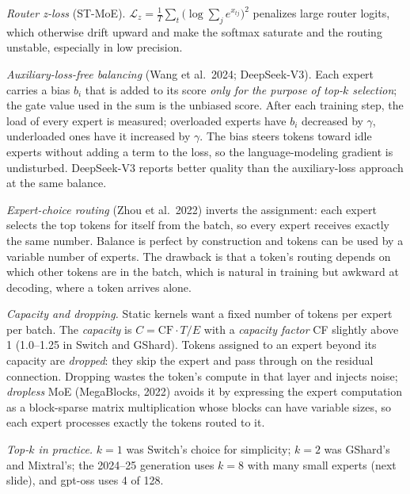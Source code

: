 \documentclass[11pt,letterpaper]{article}
\begin{document}
\emph{Router z-loss} (ST-MoE). $\mathcal{L}_z=\frac{1}{T}\sum_t\big(\log\sum_j e^{x_{tj}}\big)^2$ penalizes large router logits, which otherwise drift upward and make the softmax saturate and the routing unstable, especially in low precision.

\emph{Auxiliary-loss-free balancing} (Wang et al.\ 2024; DeepSeek-V3). Each expert carries a bias $b_i$ that is added to its score \emph{only for the purpose of top-$k$ selection}; the gate value used in the sum is the unbiased score. After each training step, the load of every expert is measured; overloaded experts have $b_i$ decreased by $\gamma$, underloaded ones have it increased by $\gamma$. The bias steers tokens toward idle experts without adding a term to the loss, so the language-modeling gradient is undisturbed. DeepSeek-V3 reports better quality than the auxiliary-loss approach at the same balance.

\emph{Expert-choice routing} (Zhou et al.\ 2022) inverts the assignment: each expert selects the top tokens for itself from the batch, so every expert receives exactly the same number. Balance is perfect by construction and tokens can be used by a variable number of experts. The drawback is that a token's routing depends on which other tokens are in the batch, which is natural in training but awkward at decoding, where a token arrives alone.

\emph{Capacity and dropping.} Static kernels want a fixed number of tokens per expert per batch. The \emph{capacity} is $C=\text{CF}\cdot T/E$ with a \emph{capacity factor} CF slightly above 1 (1.0--1.25 in Switch and GShard). Tokens assigned to an expert beyond its capacity are \emph{dropped}: they skip the expert and pass through on the residual connection. Dropping wastes the token's compute in that layer and injects noise; \emph{dropless} MoE (MegaBlocks, 2022) avoids it by expressing the expert computation as a block-sparse matrix multiplication whose blocks can have variable sizes, so each expert processes exactly the tokens routed to it.

\emph{Top-$k$ in practice.} $k=1$ was Switch's choice for simplicity; $k=2$ was GShard's and Mixtral's; the 2024--25 generation uses $k=8$ with many small experts (next slide), and gpt-oss uses 4 of 128.
\end{document}
